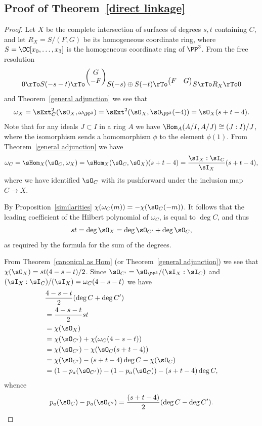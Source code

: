\subsection{Proof of Theorem~\ref{direct linkage}}

\begin{proof}
 Let $X$ be the complete intersection of surfaces of degrees $s,t$ containing $C$, and let $R_X = S/(F,G)$ be its homogeneous coordinate ring, where
$S = \CC[x_0,\dots,x_3]$ is the homogeneous coordinate ring of $\PP^3$.
From the free resolution
$$
0\rTo S(-s-t) \rTo^{
\begin{pmatrix}
 G \\ -F
\end{pmatrix}}
 S(-s)\oplus S(-t) \rTo^{
\begin{pmatrix}
 F & G
\end{pmatrix}}
 S \rTo R_{X} \rTo 0
$$
 and Theorem~\ref{general adjunction} we see that
 $$
\omega_X =  \sExt^2_C(\sO_X, \omega_{\PP^3}) =\sExt^2(\sO_X, \sO_{\PP^3}(-4)) = \sO_X(s+t-4).
 $$
Note that for any ideals $J\subset I$ in a ring $A$ we have $\Hom_A(A/I, A/J) \cong (J:I)/J$, where the isomorphism
sends a homomorphism $\phi$ to the element $\phi(1)$. From Theorem~\ref{general adjunction} we have 
$$
\omega_C = \sHom_X(\sO_C, \omega_X) = \sHom_X(\sO_C, \sO_X)(s+t-4) = \frac{\sI_X:\sI_C}{\sI_X}(s+t-4),
$$
where we have identified $\sO_C$ with its pushforward under the inclusion map $C\to X$. 

By Proposition~\ref{similarities}
$\chi(\omega_C(m)) = -\chi(\sO_C(-m))$. It follows that the leading coefficient of the Hilbert polynomial of $\omega_C$, is 
equal to $\deg C$, and thus
$$
st = \deg \sO_X = \deg \sO_{C'}+\deg \sO_C,
$$
as required by the formula for the sum of the degrees.

From Theorem~\ref{canonical as Hom} (or Theorem~\ref{general adjunction}) we see that $\chi(\sO_X) = st(4-s-t)/2$. Since $\sO_{C'} = \sO_{\PP^3}/(\sI_X : \sI_C)$ and
$(\sI_X : \sI_C)/(\sI_X) = \omega_C(4-s-t)$ we have
$$
\begin{aligned}
&\frac{4-s-t}{2}(\deg C+\deg C')\\
&=\frac{4-s-t}{2}st\\
&=\chi(\sO_X) \\
&=  \chi(\sO_{C'})+\chi(\omega_C(4-s-t)) \\
&= \chi(\sO_{C'})-\chi(\sO_C(s+t-4)) \\&= \chi(\sO_{C'})-(s+t-4)\deg C-\chi(\sO_C)\\
&= (1-p_a(\sO_{C'})) - (1-p_a(\sO_C)) -(s+t-4)\deg C,
\end{aligned}
$$
whence 
$$
p_a(\sO_C) -p_a(\sO_{C'}) = \frac{(s+t-4)}{2} (\deg C - \deg C'). 
$$
 \end{proof}

